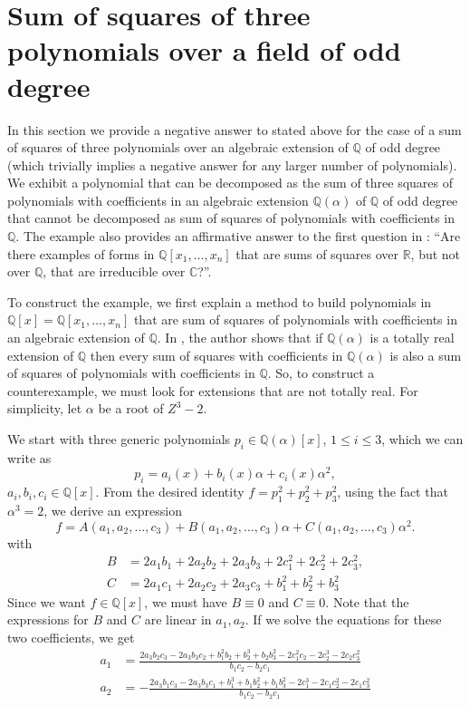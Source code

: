 \documentclass{amsart}
\theoremstyle{definition}
\theoremstyle{remark}
\numberwithin{equation}{section}
\newcommand{\C}{{\mathbb C}}
\newcommand{\Q}{{\mathbb Q}}
\newcommand{\R}{{\mathbb R}}
\begin{document}
\section{Sum of squares of three polynomials over a field of odd degree}
\label{section:counterexample}
In this section we provide a negative answer to \cite[Question 5.3]{scheiderer} stated above for the case of a sum of squares of three polynomials over an algebraic extension of $\Q$  of odd degree (which trivially implies a negative answer for any larger number of polynomials). We exhibit a polynomial that can be decomposed as the sum of three squares of polynomials with coefficients in an algebraic extension $\Q(\alpha)$ of $\Q$ of odd degree that cannot be decomposed as sum of squares of polynomials with coefficients in $\Q$. The example also provides an affirmative answer to the first question in \cite[Question 5.1]{scheiderer}: ``Are there examples of forms in $\Q[x_1, \dots, x_n]$ that are sums of squares over $\R$, but not over $\Q$, that are irreducible over $\C$?''.

To construct the example, we first explain a method to build polynomials in $\Q[x] = \Q[x_1, \dots, x_n]$ that are sum of squares of polynomials with coefficients in an algebraic extension of $\Q$.
In \cite{hillar}, the author shows that if $\Q(\alpha)$ is a totally real extension of $\Q$ then every sum of squares with coefficients in $\Q(\alpha)$ is also a sum of squares of polynomials with coefficients in $\Q$. So, to construct a counterexample, we must look for extensions that are not totally real.
For simplicity, let $\alpha$ be a root of $Z^3-2$.

We start with three generic polynomials $p_i \in \Q(\alpha)[x]$, $1 \le i \le 3$, which we can write as
\[
p_i = a_i(x) + b_i(x) \alpha + c_i(x) \alpha^2,
\]
$a_i, b_i, c_i \in \Q[x]$.
From  the desired identity $f = p_1^2 + p_2^2 + p_3^2$, using the fact that $\alpha^3 = 2$, we derive an expression
\begin{equation}
\label{fABC}
f = A(a_1, a_2, \dots, c_3) + B(a_1, a_2, \dots, c_3) \alpha + C(a_1, a_2, \dots, c_3) \alpha^2.
\end{equation}
with
\begin{align*}
B &= 2 a_1 b_1+2 a_2 b_2+2 a_3 b_3+2 c_1^2+2 c_2^2+2 c_3^2, \\
C &= 2 a_1 c_1+2 a_2 c_2+2 a_3 c_3+b_1^2+b_2^2+b_3^2
\end{align*}
Since we want $f \in \Q[x]$, we must have $B \equiv 0$ and $C \equiv 0$. Note that the expressions for $B$ and $C$ are linear in $a_1, a_2$. If we solve the equations for these two coefficients, we get
\begin{align*}
a_1 &= \frac{2 a_3 b_2 c_3-2 a_3 b_3 c_2+b_1^2 b_2+b_2^3+b_2 b_3^2-2 c_1^2 c_2-2 c_2^3-2 c_2 c_3^2}{b_1 c_2-b_2 c_1} \\
a_2 &= -\frac{2 a_3 b_1 c_3-2 a_3 b_3 c_1+b_1^3+b_1 b_2^2+b_1 b_3^2-2 c_1^3-2 c_1 c_2^2-2 c_1 c_3^2}{b_1 c_2-b_2 c_1}
\end{align*}
\end{document}
